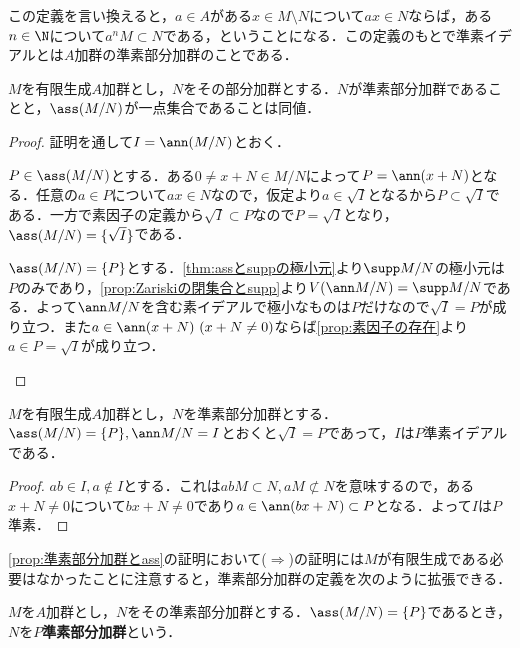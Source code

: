 この定義を言い換えると，$a\in A$がある$x\in M\setminus N$について$ax\in N$ならば，ある$n\in\N$について$a^n M\subset N$である，ということになる．この定義のもとで準素イデアルとは$A$加群の準素部分加群のことである．

\begin{prop}\label{prop:準素部分加群とass}
	$M$を有限生成$A$加群とし，$N$をその部分加群とする．$N$が準素部分加群であることと，$\ass (M/N)$が一点集合であることは同値．
\end{prop}

\begin{proof}
	証明を通して$I=\ann(M/N)$とおく．
	\begin{eqv}
		\item $P\in\ass (M/N)$とする．ある$0\neq x+N\in M/N$によって$P=\ann (x+N)$となる．任意の$a\in P$について$ax\in N$なので，仮定より$a\in\sqrt{I}$となるから$P\subset\sqrt{I}$である．一方で素因子の定義から$\sqrt{I}\subset P$なので$P=\sqrt{I}$となり，$\ass (M/N)=\{\sqrt{I}\}$である．
		
		\item $\ass(M/N)=\{P\}$とする．\ref{thm:assとsuppの極小元}より$\supp M/N$の極小元は$P$のみであり，\ref{prop:Zariskiの閉集合とsupp}より$V(\ann M/N)=\supp M/N$である．よって$\ann M/N$を含む素イデアルで極小なものは$P$だけなので$\sqrt{I}=P$が成り立つ．また$a\in\ann (x+N)~(x+N\neq0)$ならば\ref{prop:素因子の存在}より$a\in P=\sqrt{I}$が成り立つ．
	\end{eqv}
\end{proof}

\begin{prop}
	$M$を有限生成$A$加群とし，$N$を準素部分加群とする．$\ass (M/N)=\{P\},\ann M/N=I$とおくと$\sqrt{I}=P$であって，$I$は$P$準素イデアルである．
\end{prop}

\begin{proof}
	$ab\in I,a\not\in I$とする．これは$abM\subset N,aM\not\subset N$を意味するので，ある$x+N\neq0$について$bx+N\neq0$であり$a\in\ann (bx+N)\subset P$となる．よって$I$は$P$準素．
\end{proof}

\ref{prop:準素部分加群とass}の証明において($\Longrightarrow$)の証明には$M$が有限生成である必要はなかったことに注意すると，準素部分加群の定義を次のように拡張できる．

\begin{defi}
	$M$を$A$加群とし，$N$をその準素部分加群とする．$\ass(M/N)=\{P\}$であるとき，$N$を$P$\textbf{準素部分加群}という．
\end{defi}

